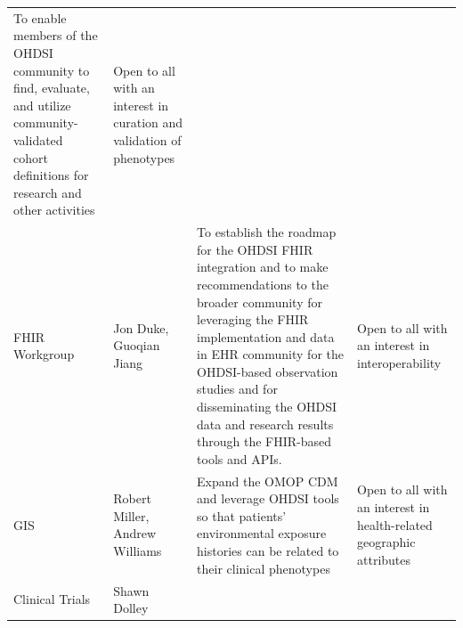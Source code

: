 \documentclass[11pt]{book}
\theoremstyle{definition}
\theoremstyle{definition}
\theoremstyle{definition}
\theoremstyle{remark}
\begin{document}
\begin{longtable}[]{@{}llll@{}}
\begin{minipage}[t]{0.22\columnwidth}
To enable members of the OHDSI community to find, evaluate, and utilize community-validated cohort definitions for research and other activities\strut
\end{minipage} & \begin{minipage}[t]{0.22\columnwidth}\raggedright
Open to all with an interest in curation and validation of phenotypes\strut
\end{minipage}\tabularnewline
\begin{minipage}[t]{0.22\columnwidth}\raggedright
FHIR Workgroup\strut
\end{minipage} & \begin{minipage}[t]{0.22\columnwidth}\raggedright
Jon Duke, Guoqian Jiang\strut
\end{minipage} & \begin{minipage}[t]{0.22\columnwidth}\raggedright
To establish the roadmap for the OHDSI FHIR integration and to make recommendations to the broader community for leveraging the FHIR implementation and data in EHR community for the OHDSI-based observation studies and for disseminating the OHDSI data and research results through the FHIR-based tools and APIs.\strut
\end{minipage} & \begin{minipage}[t]{0.22\columnwidth}\raggedright
Open to all with an interest in interoperability\strut
\end{minipage}\tabularnewline
\begin{minipage}[t]{0.22\columnwidth}\raggedright
GIS\strut
\end{minipage} & \begin{minipage}[t]{0.22\columnwidth}\raggedright
Robert Miller, Andrew Williams\strut
\end{minipage} & \begin{minipage}[t]{0.22\columnwidth}\raggedright
Expand the OMOP CDM and leverage OHDSI tools so that patients' environmental exposure histories can be related to their clinical phenotypes\strut
\end{minipage} & \begin{minipage}[t]{0.22\columnwidth}\raggedright
Open to all with an interest in health-related geographic attributes\strut
\end{minipage}\tabularnewline
\begin{minipage}[t]{0.22\columnwidth}\raggedright
Clinical Trials\strut
\end{minipage} & \begin{minipage}[t]{0.22\columnwidth}\raggedright
Shawn Dolley\strut

\end{minipage}
\end{longtable}
\end{document}
